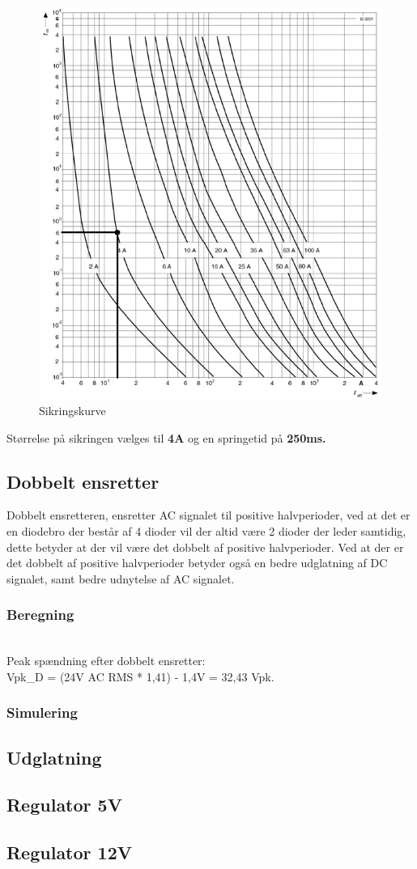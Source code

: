 \begin{figure}[H]
\centering
\includegraphics[scale=0.7]{billeder/Sikringskurve_PS}
\caption{Sikringskurve}
\label{fig:Sikringskurve_PS}
\end{figure}
Størrelse på sikringen vælges til \textbf{4A} og en springetid på \textbf{250ms.}
\subsection{Dobbelt ensretter}
Dobbelt ensretteren, ensretter AC signalet til positive halvperioder, ved at det er en diodebro der består af 4 dioder vil der altid være 2 dioder der leder samtidig, dette betyder at der vil være det dobbelt af positive halvperioder. Ved at der er det dobbelt af positive halvperioder betyder også en bedre udglatning af DC signalet, samt bedre udnytelse af AC signalet. \\
\subsubsection{Beregning} \\ 
Peak spændning efter dobbelt ensretter:\\
Vpk_D = (24V AC RMS * 1,41) - 1,4V = 32,43 Vpk.
\newpage
\subsubsection{Simulering}

\subsection{Udglatning}
\subsection{Regulator 5V}
\subsection{Regulator 12V}

